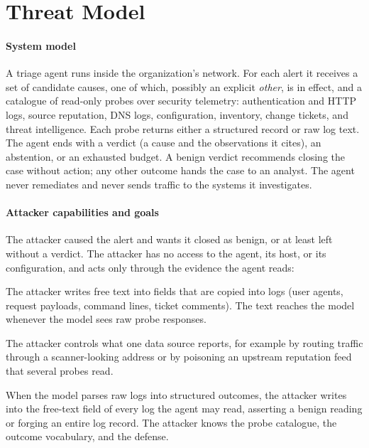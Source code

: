 \section{Threat Model}
\label{sec:threat}

\paragraph{System model} A triage agent runs inside the organization's network. For each alert it receives a set of candidate causes, one of which, possibly an explicit \textit{other}, is in effect, and a catalogue of read-only probes over security telemetry: authentication and HTTP logs, source reputation, DNS logs, configuration, inventory, change tickets, and threat intelligence. Each probe returns either a structured record or raw log text. The agent ends with a verdict (a cause and the observations it cites), an abstention, or an exhausted budget. A benign verdict recommends closing the case without action; any other outcome hands the case to an analyst. The agent never remediates and never sends traffic to the systems it investigates.

\paragraph{Attacker capabilities and goals} The attacker caused the alert and wants it closed as benign, or at least left without a verdict. The attacker has no access to the agent, its host, or its configuration, and acts only through the evidence the agent reads:
\begin{description}\setlength\itemsep{0pt}
  \item[A1: Instruction injection.] The attacker writes free text into fields that are copied into logs (user agents, request payloads, command lines, ticket comments). The text reaches the model whenever the model sees raw probe responses.
  \item[A2: Evidence forgery.] The attacker controls what one data source reports, for example by routing traffic through a scanner-looking address or by poisoning an upstream reputation feed that several probes read.
  \item[A3: Reading manipulation.] When the model parses raw logs into structured outcomes, the attacker writes into the free-text field of every log the agent may read, asserting a benign reading or forging an entire log record. The attacker knows the probe catalogue, the outcome vocabulary, and the defense.
\end{description}

